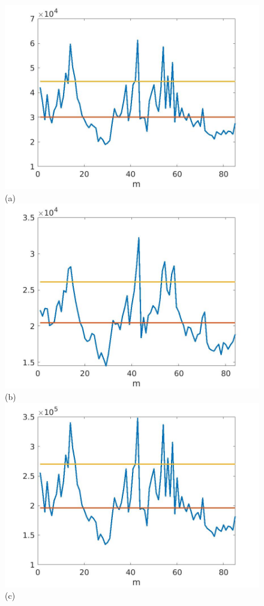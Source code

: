 \documentclass[journal]{IEEEtran}
\begin{document}
\begin{figure}[htp!]
\includegraphics[scale=.12]{../../figs/J1_euclid_squared_meandev}(a)
\includegraphics[scale=.12]{../../figs/consecdif_J1_euclid_squared_meandev}(b)\\
\includegraphics[scale=.12]{../../figs/J2_euclid_squared_meandev}(c)

\end{figure}
\end{document}
